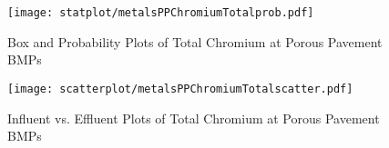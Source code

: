         \begin{figure}[hb]   %
            \centering
            \texttt{[image: statplot/metalsPPChromiumTotalprob.pdf]}
            \caption{Box and Probability Plots of Total Chromium at Porous Pavement BMPs}
        \end{figure}         %
        
        
        \begin{figure}[hb]   %
            \centering
            \texttt{[image: scatterplot/metalsPPChromiumTotalscatter.pdf]}
            \caption{Influent vs. Effluent Plots of Total Chromium at Porous Pavement BMPs}
        \end{figure}         %
        \clearpage
        